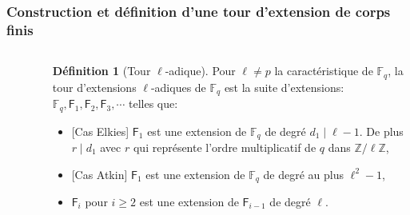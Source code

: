 \documentclass[10pt,a4paper]{beamer}
\theoremstyle{plain}
\theoremstyle{definition}
\theoremstyle{definition}
\theoremstyle{definition}
\theoremstyle{definition}
\newtheorem{defi}[thm]{Définition}
\theoremstyle{remark}
\theoremstyle{remark}
\begin{document}
\begin{frame}
\frametitle{Construction et définition d'une tour d'extension de corps finis}
\begin{columns}
\begin{column}{2cm}
\begin{center}
\begin{figure}
\end{figure}
\end{center}
\end{column}
\begin{column}{8cm}

\begin{defi}[Tour \textit{$\ell$}-adique]
Pour $\ell \neq p$ la caractéristique de $\mathbb{F}_q$, la tour d'extensions $\ell$-adiques de $\mathbb{F}_q$ est la suite d'extensions: $\mathbb{F}_q, \mathsf{F}_{1}, \mathsf{F}_{2}, \mathsf{F}_{3}, \cdots$ telles que:
\begin{itemize}
\item{} [Cas Elkies] $\mathsf{F}_{1}$ est une extension de $\mathbb{F}_q$ de degré $d_1 \mid \ell-1$. De plus $r \mid d_1$ avec $r$ qui représente l'ordre multiplicatif de $q$ dans $\mathbb{Z}/\ell \mathbb{Z}$,
\item{} [Cas Atkin] $\mathsf{F}_{1}$ est une extension de $\mathbb{F}_q$ de degré au plus $ \ell^2-1$,
\item $\mathsf{F}_{i}$ pour $i \geqslant 2$ est une extension de $\mathsf{F}_{i-1}$ de degré $\ell$.
\end{itemize}

\end{defi}
\end{column}
\end{columns}
\end{frame}

\end{document}
